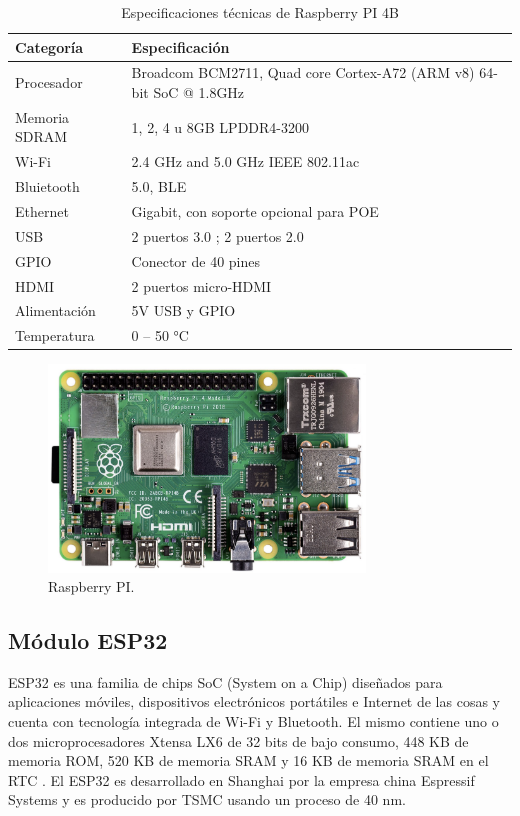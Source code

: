 \begin{table}[h]
\centering
\caption[Especificaciones técnicas de Raspberry Pi 4B]{Especificaciones técnicas de Raspberry PI 4B}

\begin{tabular}{p{3cm} p{8cm}} 
\toprule
\textbf{Categoría} & \textbf{Especificación}\\

\midrule
Procesador	& Broadcom BCM2711, Quad core Cortex-A72 (ARM v8) 64-bit SoC @ 1.8GHz \\
Memoria SDRAM	 & 1, 2, 4 u 8GB LPDDR4-3200 \\
Wi-Fi	& 2.4 GHz and 5.0 GHz IEEE 802.11ac \\
Bluietooth	&  5.0, BLE \\
Ethernet	& Gigabit, con soporte opcional para POE\\
USB	& 2 puertos  3.0 ; 2 puertos 2.0\\
GPIO	&	Conector de 40 pines\\
HDMI	&  2 puertos micro-HDMI\\
Alimentación	& 5V USB y GPIO\\
Temperatura	& 0 – 50 °C \\
\bottomrule
\hline
\end{tabular}
\label{tab:raspberrypi}
\end{table}
 
\begin{figure}[h]
	\centering
	\includegraphics[width=0.75\textwidth]{./Figures/rpi.png}
	\caption[Raspberry PI.]{Raspberry PI\protect\footnotemark.}
	\label{fig:ssl2way}
\end{figure}

\subsection{Módulo ESP32}
\label{sec:Módulo ESP32}
ESP32 es una familia de chips SoC (System on a Chip) diseñados para aplicaciones móviles, dispositivos electrónicos portátiles e Internet de las cosas y cuenta con tecnología integrada de Wi-Fi y Bluetooth. El mismo contiene uno o dos microprocesadores Xtensa LX6 de 32 bits de bajo consumo, 448 KB de memoria ROM, 520 KB de memoria SRAM y 16 KB de memoria SRAM en el RTC \citep{esp32}. El ESP32 es desarrollado en Shanghai por la empresa china Espressif Systems y es producido por TSMC usando un proceso de 40 nm.  

